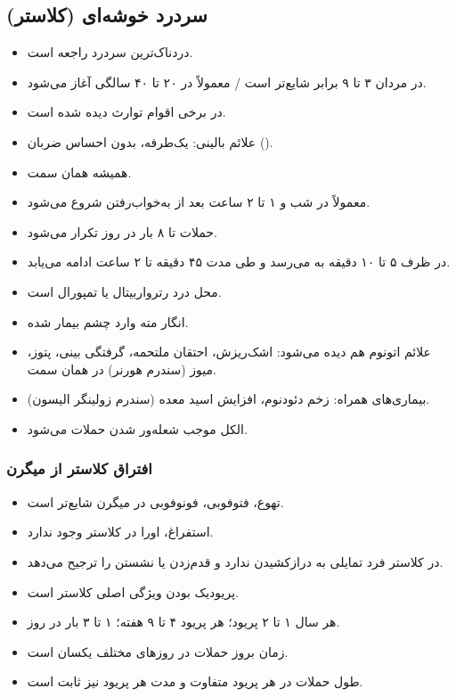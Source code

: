 \subsection{سردرد خوشه‌ای (کلاستر)}
\begin{itemize}
\item دردناک‌ترین سردرد راجعه است.
\item در مردان ۳ تا ۹ برابر شایع‌تر است / معمولاً در ۲۰ تا ۴۰ سالگی آغاز می‌شود.
\item در برخی اقوام توارث دیده شده است.
\item علائم بالینی: یک‌طرفه، بدون احساس ضربان ().
\item همیشه همان سمت.
\item معمولاً در شب و ۱ تا ۲ ساعت بعد از به‌خواب‌رفتن شروع می‌شود.
\item حملات تا ۸ بار در روز تکرار می‌شود.
\item در ظرف ۵ تا ۱۰ دقیقه به  می‌رسد و طی مدت ۴۵ دقیقه تا ۲ ساعت ادامه می‌یابد.
\item محل درد رترواربیتال یا تمپورال است.
\item انگار مته وارد چشم بیمار شده.
\item علائم اتونوم هم دیده می‌شود: اشک‌ریزش، احتقان ملتحمه، گرفتگی بینی، پتوز، میوز (سندرم هورنر) در همان سمت.
\item بیماری‌های همراه: زخم دئودنوم، افزایش اسید معده (سندرم زولینگر الیسون).
\item الکل موجب شعله‌ور شدن حملات می‌شود.
\end{itemize}
\subsubsection{افتراق کلاستر از میگرن}
\begin{itemize}
\item تهوع، فتوفوبی، فونوفوبی در میگرن شایع‌تر است.
\item استفراغ، اورا در کلاستر وجود ندارد.
\item در کلاستر فرد تمایلی به درازکشیدن ندارد و قدم‌زدن یا نشستن را ترجیح می‌دهد.
\item پریودیک بودن ویژگی اصلی کلاستر است.
\item هر سال ۱ تا ۲ پریود؛ هر پریود ۴ تا ۹ هفته؛ ۱ تا ۳ بار در روز.
\item زمان بروز حملات در روزهای مختلف یکسان است.
\item طول حملات در هر پریود متفاوت و مدت هر پریود نیز ثابت است.
\end{itemize}

